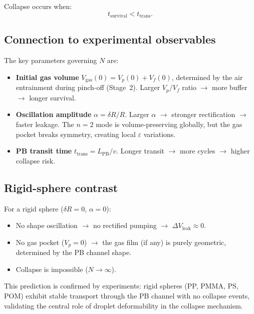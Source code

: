 \documentclass[%
 preprint,
 superscriptaddress,
 amsmath,amssymb,
 aps, prl,
]{revtex4-2}
\begin{document}
Collapse occurs when:
\begin{equation}
\boxed{t_{\text{survival}} < t_{\text{trans}}.}
\end{equation}

\subsection{Connection to experimental observables}

The key parameters governing $N$ are:

\begin{itemize}
\item \textbf{Initial gas volume} $V_{\text{gas}}(0) = V_p(0) + V_f(0)$,
      determined by the air entrainment during pinch-off (Stage~2).
      Larger $V_p/V_f$ ratio $\to$ more buffer $\to$ longer survival.

\item \textbf{Oscillation amplitude} $\alpha = \delta R/R$.
      Larger $\alpha$ $\to$ stronger rectification $\to$ faster leakage.
      The $n=2$ mode is volume-preserving globally, but the gas pocket
      breaks symmetry, creating local $\varepsilon$ variations.

\item \textbf{PB transit time} $t_{\text{trans}} = L_{\text{PB}}/v$.
      Longer transit $\to$ more cycles $\to$ higher collapse risk.
\end{itemize}

\subsection{Rigid-sphere contrast}

For a rigid sphere ($\delta R = 0$, $\alpha = 0$):
\begin{itemize}
\item No shape oscillation $\to$ no rectified pumping $\to$
      $\Delta V_{\text{leak}} \approx 0$.
\item No gas pocket ($V_p = 0$) $\to$ the gas film (if any) is purely
      geometric, determined by the PB channel shape.
\item Collapse is impossible ($N \to \infty$).
\end{itemize}

This prediction is confirmed by experiments: rigid spheres (PP, PMMA, PS, POM)
exhibit stable transport through the PB channel with no collapse events,
validating the central role of droplet deformability in the collapse mechanism.
\end{document}
